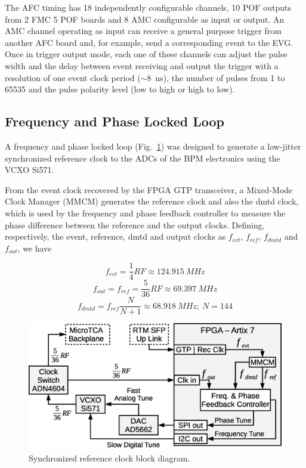 \documentclass[a4paper,
               biblatex,      %
               ]{jacow}
\begin{document}
The AFC timing has 18 independently configurable channels, 10 POF outputs from 2 FMC 5 POF boards and 8 AMC configurable as input or output. An AMC channel operating as input can receive a general purpose trigger from another AFC board and, for example, send a corresponding event to the EVG. Once in trigger output mode, each one of these channels can adjust the pulse width and the delay between event receiving and output the trigger with a resolution of one event clock period ($\sim$8~ns), the number of pulses from 1 to 65535 and the pulse polarity level (low to high or high to low).  

\subsection{Frequency and Phase Locked Loop}
 A frequency and phase locked loop (Fig.~\ref{fig:AFCRefClockLoop}) was designed to generate a low-jitter synchronized reference clock to the ADCs of the BPM electronics using the VCXO Si571.
 
From the event clock recovered by the FPGA GTP transceiver, a Mixed-Mode Clock Manager (MMCM) generates the reference clock and also the dmtd clock, which is used by the frequency and phase feedback controller to measure the phase difference between the reference and the output clocks. Defining, respectively, the event, reference, dmtd and output clocks as $f_{evt}$, $f_{ref}$, $f_{dmtd}$ and $f_{out}$, we have

\[f_{evt} = \frac{1}{4}RF \approx 124.915~MHz\]
\[f_{out} = f_{ref} = \frac{5}{36}RF \approx 69.397~MHz\]
\[f_{dmtd} = f_{ref}\frac{N}{N+1} \approx 68.918~MHz;~N=144\]

\begin{figure}[!htb]
   \centering
   \includegraphics*[width=0.9\columnwidth]{AFCRefClockLoop}
   \caption{Synchronized reference clock block diagram.}
   \label{fig:AFCRefClockLoop}
\end{figure}
\end{document}

